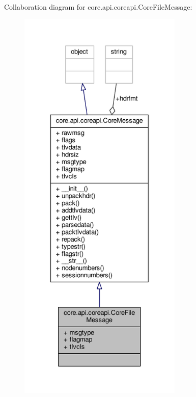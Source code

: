 Collaboration diagram for core.\+api.\+coreapi.\+Core\+File\+Message\+:
\nopagebreak
\begin{figure}[H]
\begin{center}
\leavevmode
\includegraphics[height=550pt]{classcore_1_1api_1_1coreapi_1_1_core_file_message__coll__graph}
\end{center}
\end{figure}
